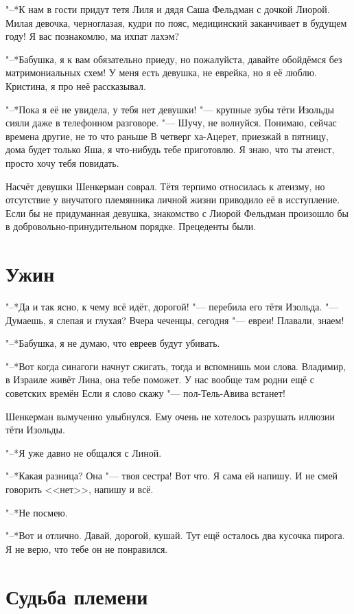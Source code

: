 "--*К нам в гости придут тетя Лиля и дядя Саша Фельдман с дочкой Лиорой.
Милая девочка, черноглазая, кудри по пояс, медицинский заканчивает в будущем году!
Я вас познакомлю, ма ихпат лахэм?

"--*Бабушка, я к вам обязательно приеду, но пожалуйста, давайте обойдёмся без матримониальных схем!
У меня есть девушка, не еврейка, но я её люблю.
Кристина, я про неё рассказывал.

"--*Пока я её не увидела, у тебя нет девушки! "--- крупные зубы тёти Изольды сияли даже в телефонном разговоре.
"--- Шучу, не волнуйся.
Понимаю, сейчас времена другие, не то что раньше\ldotst
В четверг ха-Ацерет, приезжай в пятницу, дома будет только Яша, я что-нибудь тебе приготовлю.
Я знаю, что ты атеист, просто хочу тебя повидать.

Насчёт девушки Шенкерман соврал.
Тётя терпимо относилась к атеизму, но отсутствие у внучатого племянника личной жизни приводило её в исступление.
Если бы не придуманная девушка, знакомство с Лиорой Фельдман произошло бы в добровольно-принудительном порядке.
Прецеденты были.

\section{Ужин}

"--*Да и так ясно, к чему всё идёт, дорогой! "--- перебила его тётя Изольда.
"--- Думаешь, я слепая и глухая?
Вчера чеченцы, сегодня "--- евреи!
Плавали, знаем!

"--*Бабушка, я не думаю, что евреев будут убивать.

"--*Вот когда синагоги начнут сжигать, тогда и вспомнишь мои слова.
Владимир, в Израиле живёт Лина, она тебе поможет.
У нас вообще там родни ещё с советских времён\ldotse
Если я слово скажу "--- пол-Тель-Авива встанет!

Шенкерман вымученно улыбнулся.
Ему очень не хотелось разрушать иллюзии тёти Изольды.

"--*Я уже давно не общался с Линой.

"--*Какая разница?
Она "--- твоя сестра!
Вот что.
Я сама ей напишу.
И не смей говорить <<нет>>, напишу и всё.

"--*Не посмею.

"--*Вот и отлично.
Давай, дорогой, кушай.
Тут ещё осталось два кусочка пирога.
Я не верю, что тебе он не понравился.

\section{Судьба племени}

